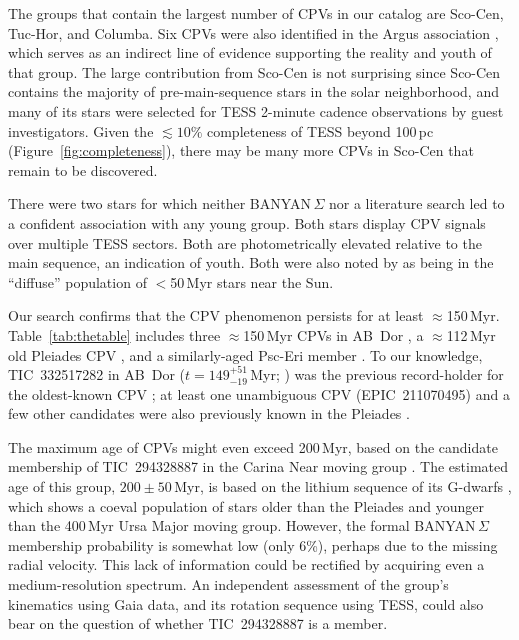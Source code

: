 \documentclass[11pt,twocolumn,tighten,linenumbers]{aastex63}
\begin{document}
The groups that contain the largest number of CPVs in our catalog are
Sco-Cen, Tuc-Hor, and Columba.  Six CPVs were also identified in the
Argus association \citep{2019ApJ...870...27Z}, which serves as an
indirect line of evidence supporting the reality and youth of that
group.  The large contribution from Sco-Cen is not surprising since
Sco-Cen contains the majority of pre-main-sequence stars in the solar
neighborhood, and many of its stars were selected for TESS 2-minute
cadence observations by guest investigators.  Given the
$\lesssim$$10\%$ completeness of TESS beyond 100\,pc
(Figure~\ref{fig:completeness}), there may be many more CPVs in
Sco-Cen that remain to be discovered.

There were two stars for which neither BANYAN\,$\Sigma$ nor a
literature search led to a confident association with any young group.
Both stars display CPV signals over multiple TESS sectors. Both are
photometrically elevated relative to the main sequence, an indication
of youth.  Both were also noted by \citet{2021ApJ...917...23K} as
being in the ``diffuse'' population of $<$50\,Myr stars near the Sun.

Our search confirms that the CPV phenomenon persists for at least
$\approx$150\,Myr.  Table~\ref{tab:thetable} includes three
$\approx$150\,Myr CPVs in AB~Dor \citep{2015MNRAS.454..593B}, a
$\approx$112\,Myr old Pleiades CPV \citep{2015ApJ...813..108D}, and a
similarly-aged Psc-Eri member \citep{2020A&A...639A..64R}.  To our
knowledge, TIC~332517282 in AB~Dor ($t$$=$$149^{+51}_{-19}$\,Myr;
\citealt{2015MNRAS.454..593B}) was the previous record-holder for the
oldest-known CPV \citep{2019ApJ...876..127Z,2022AJ....163..144G}; at
least one unambiguous CPV (EPIC~211070495) and a few other candidates
were also previously known in the Pleiades
\citep{2016AJ....152..114R}.  

The maximum age of CPVs might even exceed 200\,Myr, based on the
candidate membership of TIC~294328887 in the Carina Near moving group
\citep{2006ApJ...649L.115Z}.  The estimated age of this group, $200
\pm 50$\,Myr, is based on the lithium sequence of its G-dwarfs
\citep{2006ApJ...649L.115Z}, which shows a coeval population of stars
older than the Pleiades and younger than the 400\,Myr Ursa Major
moving group.  However, the formal BANYAN\,$\Sigma$ membership
probability is somewhat low (only 6\%), perhaps due to the missing
radial velocity.  This lack of information could be rectified by
acquiring even a medium-resolution spectrum.  An independent
assessment of the group's kinematics using Gaia data, and its rotation
sequence using TESS, could also bear on the question of whether
TIC~294328887 is a member.
\end{document}
